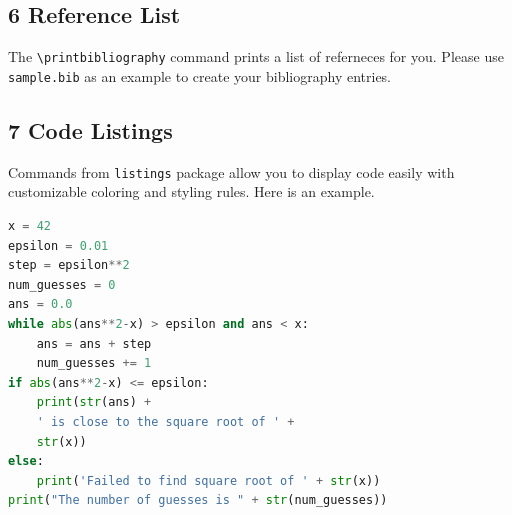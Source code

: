 \documentclass{ccsc_paper}
\begin{document}
\subsection{6 Reference List}
The \verb+\printbibliography+ command prints a list of referneces for you. Please use \texttt{sample.bib} as an example to create your bibliography entries.

\subsection{7 Code Listings}
Commands from \texttt{listings} package allow you to display code easily with customizable coloring and styling rules. Here is an example.

\begin{lstlisting}[language=Python,  caption=Python example]
x = 42
epsilon = 0.01
step = epsilon**2
num_guesses = 0
ans = 0.0
while abs(ans**2-x) > epsilon and ans < x:
    ans = ans + step
    num_guesses += 1
if abs(ans**2-x) <= epsilon:
    print(str(ans) +
    ' is close to the square root of ' +
    str(x))
else:
    print('Failed to find square root of ' + str(x))
print("The number of guesses is " + str(num_guesses))
\end{lstlisting}
\end{document}
